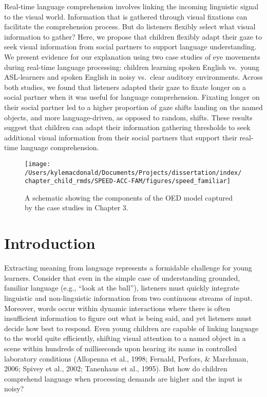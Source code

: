 \documentclass[oneside]{report}
\begin{document}
Real-time language comprehension involves linking the incoming
linguistic signal to the visual world. Information that is gathered
through visual fixations can facilitate the comprehension process. But
do listeners flexibly select what visual information to gather? Here, we
propose that children flexibly adapt their gaze to seek visual
information from social partners to support language understanding. We
present evidence for our explanation using two case studies of eye
movements during real-time language processing: children learning spoken
English vs.~young ASL-learners and spoken English in noisy vs.~clear
auditory environments. Across both studies, we found that listeners
adapted their gaze to fixate longer on a social partner when it was
useful for language comprehension. Fixating longer on their social
partner led to a higher proportion of gaze shifts landing on the named
objects, and more language-driven, as opposed to random, shifts. These
results suggest that children can adapt their information gathering
thresholds to seek additional visual information from their social
partners that support their real-time language comprehension.
\begin{figure}[t]

{\centering \texttt{[image: /Users/kylemacdonald/Documents/Projects/dissertation/index/chapter\_child\_rmds/SPEED-ACC-FAM/figures/speed\_familiar]} 

}

\caption[Overview of Chapter 3.]{A schematic showing the components of the OED model captured by the case studies in Chapter 3.}\label{fig:schematic-speed-fam}
\end{figure}
\section{Introduction}\label{introduction-2}

Extracting meaning from language represents a formidable challenge for
young learners. Consider that even in the simple case of understanding
grounded, familiar language (e.g., ``look at the ball''), listeners must
quickly integrate linguistic and non-linguistic information from two
continuous streams of input. Moreover, words occur within dynamic
interactions where there is often insufficient information to figure out
what is being said, and yet listeners must decide how best to respond.
Even young children are capable of linking language to the world quite
efficiently, shifting visual attention to a named object in a scene
within hundreds of milliseconds upon hearing its name in controlled
laboratory conditions (Allopenna et al., 1998; Fernald, Perfors, \&
Marchman, 2006; Spivey et al., 2002; Tanenhaus et al., 1995). But how do
children comprehend language when processing demands are higher and the
input is noisy?
\end{document}
